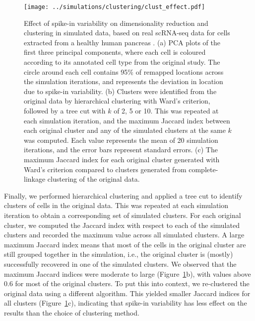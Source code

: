 \documentclass{article}
\begin{document}
\begin{figure}[btp]
    \begin{center}
        \texttt{[image: ../simulations/clustering/clust\_effect.pdf]}
    \end{center}
    \caption{Effect of spike-in variability on dimensionality reduction and clustering in simulated data,
        based on real scRNA-seq data for cells extracted from a healthy human pancreas \autocite{segerstople2016single}.
        (a) PCA plots of the first three principal components, where each cell is coloured according to its annotated cell type from the original study. 
        The circle around each cell contains 95\% of remapped locations across the simulation iterations, and represents the deviation in location due to spike-in variability.
        (b) Clusters were identified from the original data by hierarchical clustering with Ward's criterion, followed by a tree cut with $k$ of 2, 5 or 10.
        This was repeated at each simulation iteration, and the maximum Jaccard index between each original cluster and any of the simulated clusters at the same $k$ was computed.
        Each value represents the mean of 20 simulation iterations, and the error bars represent standard errors.
        (c) The maximum Jaccard index for each original cluster generated with Ward's criterion compared to clusters generated from complete-linkage clustering of the original data.
    }
    \label{fig:dimclust}
\end{figure}

Finally, we performed hierarchical clustering and applied a tree cut to identify clusters of cells in the original data.
This was repeated at each simulation iteration to obtain a corresponding set of simulated clusters.
For each original cluster, we computed the Jaccard index with respect to each of the simulated clusters and recorded the maximum value across all simulated clusters.
A large maximum Jaccard index means that most of the cells in the original cluster are still grouped together in the simulation,
i.e., the original cluster is (mostly) successfully recovered in one of the simulated clusters.
We observed that the maximum Jaccard indices were moderate to large (Figure~\ref{fig:dimclust}b), with values above 0.6 for most of the original clusters.
To put this into context, we re-clustered the original data using a different algorithm.
This yielded smaller Jaccard indices for all clusters (Figure~\ref{fig:dimclust}c), indicating that spike-in variability has less effect on the results than the choice of clustering method.
\end{document}
